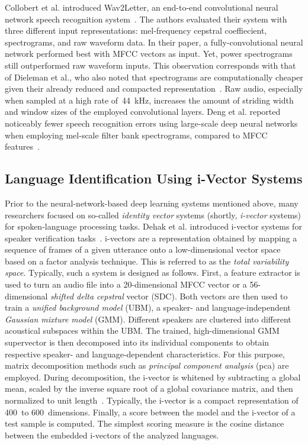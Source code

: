 Collobert et al. introduced Wav2Letter, an end-to-end convolutional neural network speech recognition system~\cite{collobert2016wav2letter}. The authors evaluated their system with three different input representations: mel-frequency cepstral coeffiecient, spectrograms, and raw waveform data. In their paper, a fully-convolutional neural network performed best with MFCC vectors as input. Yet, power spectrograms still outperformed raw waveform inputs. This observation corresponds with that of Dieleman et al., who also noted that spectrograms are computationally cheaper given their already reduced and compacted representation~\cite{dieleman2014end}. Raw audio, especially when sampled at a high rate of~\SI{44}{\kilo\hertz}, increases the amount of striding width and window sizes of the employed convolutional layers.
Deng et al. reported noticeably fewer speech recognition errors using large-scale deep neural networks when employing mel-scale filter bank spectrograms, compared to MFCC features~\cite{deng2013recent}.

\subsection{Language Identification Using i-Vector Systems}
\label{sec:i-vector-systems}
Prior to the neural-network-based deep learning systems mentioned above, many researchers focused on so-called \emph{identity vector} systems (shortly, \emph{i-vector} systems) for spoken-language processing tasks. Dehak et al. introduced i-vector systems for speaker verification tasks~\cite{dehak2011front}. i-vectors are a representation obtained by mapping a sequence of frames of a given utterance onto a low-dimensional vector space based on a factor analysis technique. This is referred to as the \emph{total variability space}. Typically, such a system is designed as follows. First, a feature extractor is used to turn an audio file into a \num{20}-dimensional MFCC vector or a \num{56}-dimensional \emph{shifted delta cepstral} vector (SDC). Both vectors are then used to train a \emph{unified background model} (UBM), a speaker- and language-independent \emph{Gaussian mixture model} (GMM). Different speakers are clustered into different acoustical subspaces within the UBM. The trained, high-dimensional GMM supervector is then decomposed into its individual components to obtain respective speaker- and language-dependent characteristics. For this purpose, matrix decomposition methods such as \emph{principal component analysis} (\ac{pca}) are employed. During decomposition, the i-vector is whitened by subtracting a global mean, scaled by the inverse square root of a global covariance matrix, and then normalized to unit length~\cite{garcia2011analysis}. Typically, the i-vector is a compact representation of \num{400}~to \num{600}~dimensions. Finally, a score between the model and the i-vector of a test sample is computed. The simplest scoring measure is the cosine distance between the embedded i-vectors of the analyzed languages.

